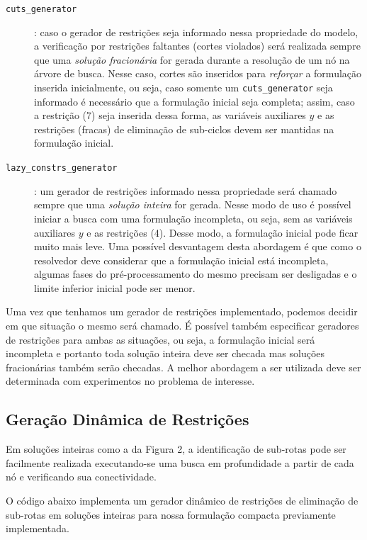 \documentclass[a4paper,11pt,fleqn]{article}
\begin{document}
\begin{description}
	\item[\texttt{cuts\_generator}]: caso o gerador de restrições seja informado nessa propriedade do modelo, a verificação por restrições faltantes (cortes violados) será realizada sempre que uma \emph{solução fracionária} for gerada durante a resolução de um nó na árvore de busca. Nesse caso, cortes são inseridos para \emph{reforçar} a formulação inserida inicialmente, ou seja, caso somente um \texttt{cuts\_generator} seja informado é necessário que a formulação inicial seja completa; assim, caso a restrição (7) seja inserida dessa forma, as variáveis auxiliares $y$ e as restrições (fracas) de eliminação de sub-ciclos devem ser mantidas na formulação inicial.
	
	\item[\texttt{lazy\_constrs\_generator}]: um gerador de restrições informado nessa propriedade será chamado sempre que uma \emph{solução inteira} for gerada. Nesse modo de uso é possível iniciar a busca com uma formulação incompleta, ou seja, sem as variáveis auxiliares $y$ e as restrições (4). Desse modo, a formulação inicial pode ficar muito mais leve. Uma possível desvantagem desta abordagem é que como o resolvedor deve considerar que a formulação inicial está incompleta, algumas fases do pré-processamento do mesmo precisam ser desligadas e o limite inferior inicial pode ser menor.
\end{description}

Uma vez que tenhamos um gerador de restrições implementado, podemos decidir em que situação o mesmo será chamado. É possível também especificar geradores de restrições para ambas as situações, ou seja, a formulação inicial será incompleta e portanto toda solução inteira deve ser checada mas soluções fracionárias também serão checadas. A melhor abordagem a ser utilizada deve ser determinada com experimentos no problema de interesse.

\subsection{Geração Dinâmica de Restrições}

Em soluções inteiras como a da Figura 2, a identificação de sub-rotas pode ser facilmente realizada executando-se uma busca em profundidade a partir de cada nó e verificando sua conectividade. 

O código abaixo implementa um gerador dinâmico de restrições de eliminação de sub-rotas em soluções inteiras para nossa formulação compacta previamente implementada. 
\end{document}
